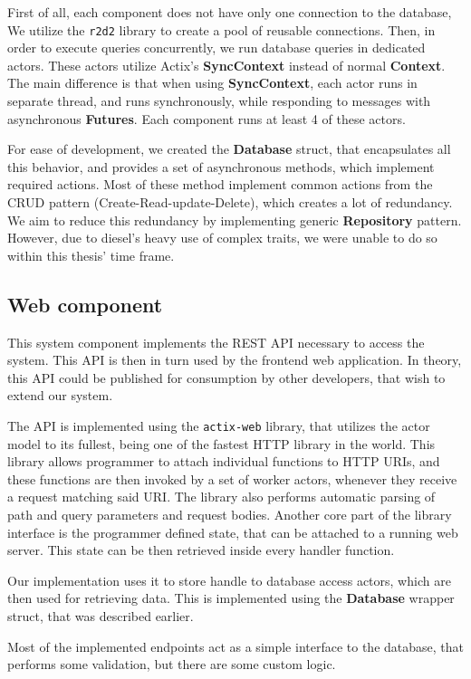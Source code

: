 First of all, each component does  not have only one connection to the database, We utilize the \verb|r2d2| library
to create a pool of reusable connections. Then, in order to execute queries concurrently, we run database queries
in dedicated actors. These actors utilize Actix's \textbf{SyncContext} instead of normal \textbf{Context}. The main difference
is that when using \textbf{SyncContext}, each actor runs in separate thread, and runs synchronously, while responding to
messages with asynchronous \textbf{Futures}. Each component runs at least 4 of these actors.

For ease of development, we created the \textbf{Database} struct, that encapsulates all this behavior, and provides
a set of asynchronous methods, which implement required actions. Most of these method implement common actions
from the CRUD pattern (Create-Read-update-Delete), which creates a lot of redundancy. We aim to reduce this redundancy
by implementing generic \textbf{Repository} pattern. However, due to diesel's heavy use of complex traits, we
were unable to do so within this thesis' time frame.

\subsection{Web component}
This system component implements the REST API necessary to access the system. This API is then
in turn used by the frontend web application. In theory, this API could be published for consumption by
other developers, that wish to extend our system.

The API is implemented using the \verb|actix-web| library, that utilizes the actor model to its fullest,
being one of the fastest HTTP library in the world\cite{techempower_benchmark}. This library
allows programmer to attach individual functions to HTTP URIs, and these functions are then invoked by a
set of worker actors, whenever they receive a request matching said URI. The library also performs automatic parsing
of path and query parameters and request bodies. Another core part of the library interface is the programmer defined
state, that can be attached to a running web server. This state can be then retrieved inside every handler function.

Our implementation uses it to store handle to database access actors, which are then used for retrieving data.
This is implemented using the \textbf{Database} wrapper struct, that was described earlier.

Most of the implemented endpoints act as a simple interface to the database, that performs some validation, but there
are some custom logic.

